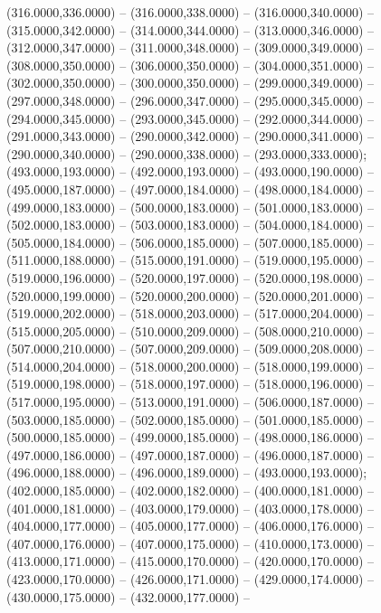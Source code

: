 \begin{scope}[shift={(-231.87,-121.87)}]
\begin{scope}[draw=black,fill=cfdae61,line join=round,line width=0.208pt]
        (316.0000,336.0000) -- (316.0000,338.0000) -- (316.0000,340.0000) --
        (315.0000,342.0000) -- (314.0000,344.0000) -- (313.0000,346.0000) --
        (312.0000,347.0000) -- (311.0000,348.0000) -- (309.0000,349.0000) --
        (308.0000,350.0000) -- (306.0000,350.0000) -- (304.0000,351.0000) --
        (302.0000,350.0000) -- (300.0000,350.0000) -- (299.0000,349.0000) --
        (297.0000,348.0000) -- (296.0000,347.0000) -- (295.0000,345.0000) --
        (294.0000,345.0000) -- (293.0000,345.0000) -- (292.0000,344.0000) --
        (291.0000,343.0000) -- (290.0000,342.0000) -- (290.0000,341.0000) --
        (290.0000,340.0000) -- (290.0000,338.0000) -- (293.0000,333.0000);
       (493.0000,193.0000) -- (492.0000,193.0000) --
        (493.0000,190.0000) -- (495.0000,187.0000) -- (497.0000,184.0000) --
        (498.0000,184.0000) -- (499.0000,183.0000) -- (500.0000,183.0000) --
        (501.0000,183.0000) -- (502.0000,183.0000) -- (503.0000,183.0000) --
        (504.0000,184.0000) -- (505.0000,184.0000) -- (506.0000,185.0000) --
        (507.0000,185.0000) -- (511.0000,188.0000) -- (515.0000,191.0000) --
        (519.0000,195.0000) -- (519.0000,196.0000) -- (520.0000,197.0000) --
        (520.0000,198.0000) -- (520.0000,199.0000) -- (520.0000,200.0000) --
        (520.0000,201.0000) -- (519.0000,202.0000) -- (518.0000,203.0000) --
        (517.0000,204.0000) -- (515.0000,205.0000) -- (510.0000,209.0000) --
        (508.0000,210.0000) -- (507.0000,210.0000) -- (507.0000,209.0000) --
        (509.0000,208.0000) -- (514.0000,204.0000) -- (518.0000,200.0000) --
        (518.0000,199.0000) -- (519.0000,198.0000) -- (518.0000,197.0000) --
        (518.0000,196.0000) -- (517.0000,195.0000) -- (513.0000,191.0000) --
        (506.0000,187.0000) -- (503.0000,185.0000) -- (502.0000,185.0000) --
        (501.0000,185.0000) -- (500.0000,185.0000) -- (499.0000,185.0000) --
        (498.0000,186.0000) -- (497.0000,186.0000) -- (497.0000,187.0000) --
        (496.0000,187.0000) -- (496.0000,188.0000) -- (496.0000,189.0000) --
        (493.0000,193.0000);
       (402.0000,185.0000) -- (402.0000,182.0000) --
        (400.0000,181.0000) -- (401.0000,181.0000) -- (403.0000,179.0000) --
        (403.0000,178.0000) -- (404.0000,177.0000) -- (405.0000,177.0000) --
        (406.0000,176.0000) -- (407.0000,176.0000) -- (407.0000,175.0000) --
        (410.0000,173.0000) -- (413.0000,171.0000) -- (415.0000,170.0000) --
        (420.0000,170.0000) -- (423.0000,170.0000) -- (426.0000,171.0000) --
        (429.0000,174.0000) -- (430.0000,175.0000) -- (432.0000,177.0000) --

\end{scope}
\end{scope}
